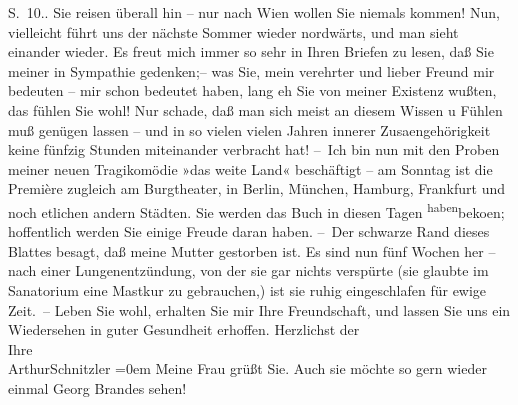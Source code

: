 \begin{ledgroupsized}[t]{13cm}
{{{                     S. 10.}}}\label{K_L02035_1h}.\pend
           \pstart
           Sie reisen überall hin – nur nach Wien wollen Sie
               niemals kommen! Nun, vielleicht führt uns der nächste Sommer wieder nordwärts, und
               man sieht einander wieder. Es freut mich immer so sehr in Ihren Briefen zu lesen, daß
               Sie meiner {\pb}in Sympathie gedenken;– was Sie, mein
               verehrter und lieber Freund mir bedeuten – mir schon bedeutet haben, lang eh Sie von
               meiner Existenz wußten, das fühlen Sie wohl! Nur schade, daß man sich meist an diesem
               Wissen u Fühlen muß genügen lassen – und in so vielen vielen Jahren innerer Zusa{\geminationm}engehörigkeit keine fünfzig Stunden miteinander
               verbracht hat!\pend
           \pstart
           – Ich bin nun mit den Proben meiner {\pb}neuen
               Tragikomödie »das weite Land« beschäftigt – am
               Sonntag ist die Première zugleich am Burgtheater,
               in Berlin, München, Hamburg, Frankfurt und noch etlichen andern Städten. Sie werden das Buch in diesen Tagen \substVorne{}\textsuperscript{haben}\substDazwischen{}beko{\geminationm}en\substHinten{}; hoffentlich werden Sie einige Freude daran haben.\pend
           \pstart
           – Der schwarze Rand dieses Blattes besagt, daß meine Mutter gestorben ist. Es sind nun fünf
               Wochen her – nach einer {\pb}Lungenentzündung, von der
               sie gar nichts verspürte (sie glaubte im Sanatorium eine Mastkur zu gebrauchen,) ist
               sie ruhig eingeschlafen für ewige Zeit. –\pend
           \pstart
           Leben Sie wohl, erhalten Sie mir Ihre Freundschaft, und lassen Sie uns ein
               Wiedersehen in guter Gesundheit erhoffen.\pend
           \pstart
           Herzlichst der{\\[\baselineskip]}Ihre{\\[\baselineskip]}\spacefill\mbox{ArthurSchnitzler}\pend
           \leftskip=0em{}\pstart
           \noindent{}Meine Frau grüßt Sie. Auch
                  sie möchte so gern wieder einmal Georg Brandes sehen!\pend
           

\end{ledgroupsized}
